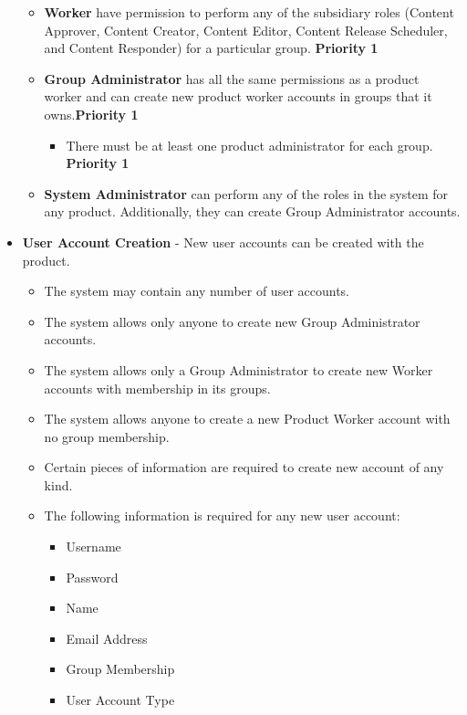 \documentclass{article}
\begin{document}
\begin{itemize}
\begin{itemize}
					\item \textbf{Worker} have permission to perform any 
					of the subsidiary roles (Content Approver, Content Creator, 
						Content Editor, Content Release Scheduler, and Content 
						Responder) for a particular group.  \textbf{Priority 1}
					
					\item \textbf{Group Administrator} has all the same 
					permissions as a product worker and can create new product
					worker accounts in groups that it owns.\textbf{Priority 1}  
					
					\begin{itemize}
						\item There must be at least one product administrator 
						for each group. \textbf{Priority 1}
					\end{itemize}

					\item \textbf{System Administrator} can perform any of the roles in the system for any product.
					Additionally, they can create Group Administrator 
				accounts.
				\end{itemize}

				\item \textbf{User Account Creation} - New user accounts can be 
				created with the product.
					\begin{itemize}
						\item The system may contain any number of user 
						accounts.
						\item The system allows only anyone to create new 
						Group Administrator accounts.
						\item The system allows only a Group Administrator to 
						create new Worker accounts with membership in 
						its groups.
						\item The system allows anyone to create a new Product 
						Worker account with no group membership.
						\item Certain pieces of information are required to 
						create new account of any kind.
						\item The following information is required for any new 
						user account:
							\begin{itemize}
								\item Username
								\item Password
								\item Name
								\item Email Address
								\item Group Membership
								\item User Account Type
							\end{itemize}	
				

\end{itemize}
\end{itemize}
\end{document}
